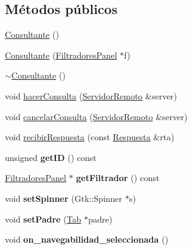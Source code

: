 \subsection*{\-Métodos públicos}
\begin{DoxyCompactItemize}
\item 
\hyperlink{classConsultante_a213165c9f95de185c5ad905ce61b0821}{\-Consultante} ()
\item 
\hyperlink{classConsultante_aaa0291cce87b35d6acc1b6ad1a045b94}{\-Consultante} (\hyperlink{classFiltradoresPanel}{\-Filtradores\-Panel} $\ast$f)
\item 
\hyperlink{classConsultante_afddd574341172d51ef0063b08b336954}{$\sim$\-Consultante} ()
\item 
void \hyperlink{classConsultante_af542575efe45d1c153b4ca76c15e8ebb}{hacer\-Consulta} (\hyperlink{classServidorRemoto}{\-Servidor\-Remoto} \&server)
\item 
void \hyperlink{classConsultante_a3b44313153ac4f5f2859759992657544}{cancelar\-Consulta} (\hyperlink{classServidorRemoto}{\-Servidor\-Remoto} \&server)
\item 
void \hyperlink{classConsultante_af9b4dae4f51439065cf8cac942020409}{recibir\-Respuesta} (const \hyperlink{classRespuesta}{\-Respuesta} \&rta)
\item 
\hypertarget{classConsultante_ad546e54e0a92ea18a21f0f506ecaf4ba}{unsigned {\bfseries get\-I\-D} () const }\label{classConsultante_ad546e54e0a92ea18a21f0f506ecaf4ba}

\item 
\hypertarget{classConsultante_a284fd364766ee4715bb81c4a5e8fc28c}{\hyperlink{classFiltradoresPanel}{\-Filtradores\-Panel} $\ast$ {\bfseries get\-Filtrador} () const }\label{classConsultante_a284fd364766ee4715bb81c4a5e8fc28c}

\item 
\hypertarget{classConsultante_a7d08d916fc29dab431bda10d6b4b080f}{void {\bfseries set\-Spinner} (\-Gtk\-::\-Spinner $\ast$s)}\label{classConsultante_a7d08d916fc29dab431bda10d6b4b080f}

\item 
\hypertarget{classConsultante_aac6df63c36a39a1cf35e8a56145a05a6}{void {\bfseries set\-Padre} (\hyperlink{classTab}{\-Tab} $\ast$padre)}\label{classConsultante_aac6df63c36a39a1cf35e8a56145a05a6}

\item 
\hypertarget{classConsultante_abddbc33c597f6db2b17ada7d011a4c90}{void {\bfseries on\-\_\-navegabilidad\-\_\-seleccionada} ()}\label{classConsultante_abddbc33c597f6db2b17ada7d011a4c90}

\end{DoxyCompactItemize}

